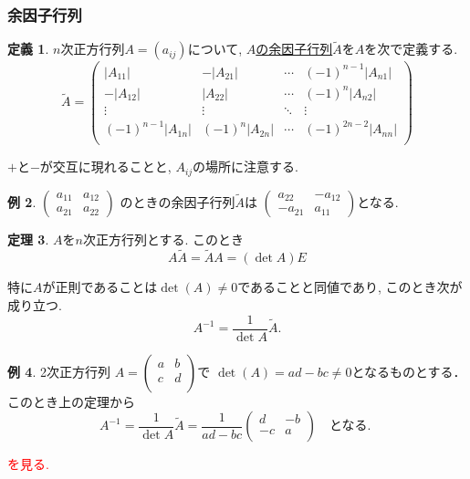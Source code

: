 \documentclass[dvipdfmx,a4paper,11pt]{article} %
\newcommand{\xr}[1]{\textcolor{red}{#1}}
\theoremstyle{definition}
\newtheorem{thm}{定理}
\newtheorem{dfn}[thm]{定義}
\newtheorem{exa}[thm]{例}
\begin{document}
 \subsubsection{余因子行列}

 
\begin{dfn}
    $n$次正方行列$A=(a_{ij})$について, 
     \underline{$A$の余因子行列$\widetilde{A}$}を$A$を次で定義する. 
    $$
\widetilde{A}
=
\begin{pmatrix}
|A_{11}|& -|A_{21}|& \cdots & (-1)^{n-1} |A_{n1}| \\
 -|A_{12}| & |A_{22}|  & \cdots &(-1)^{n} |A_{n2}|  \\
\vdots& \vdots	&	\ddots   &	\vdots \\
 (-1)^{n-1} |A_{1n}|&  (-1)^{n} |A_{2n}| & \cdots &(-1)^{2n-2}|A_{nn}|\\
\end{pmatrix}
$$
     \end{dfn}
     $+$と$-$が交互に現れることと, $A_{ij}$の場所に注意する. 

\begin{exa}\cite[例 3.4.2]{O}
\label{inverse_2}
$
\begin{pmatrix}
a_{11} & a_{12} \\
a_{21} & a_{22}
\end{pmatrix}
$
のときの余因子行列$\widetilde{A}$は
$\begin{pmatrix}
a_{22} &- a_{12} \\
-a_{21} & a_{11}
\end{pmatrix}$となる.
\end{exa}

    \begin{thm}\cite[定理 3.4.3-4]{O}
 $A$を$n$次正方行列とする. このとき
$$A\widetilde{A} = \widetilde{A}A =(\det A)E$$

特に$A$が正則であることは$\det(A) \neq 0$であることと同値であり, このとき次が成り立つ.
$$A^{-1} = \frac{1}{\det A} \widetilde{A}.$$
     \end{thm}


\begin{exa}2次正方行列
 $A=
  \begin{pmatrix}
 a& b  \\
 c& d  \\
 \end{pmatrix} 
 $で
  $\det(A)=ad-bc \neq 0$となるものとする． 
  このとき上の定理から
 $$
 A^{-1} =   
 \frac{1}{\det A} \widetilde{A}
 =
 \frac{1}{ad-bc}
 \begin{pmatrix}
 d& -b  \\
 -c& a  \\
 \end{pmatrix} 
 \quad 
 \text{となる. }
 $$
\end{exa}
 \xr{\cite[例 3.4.5]{O}を見る.}
\end{document}
